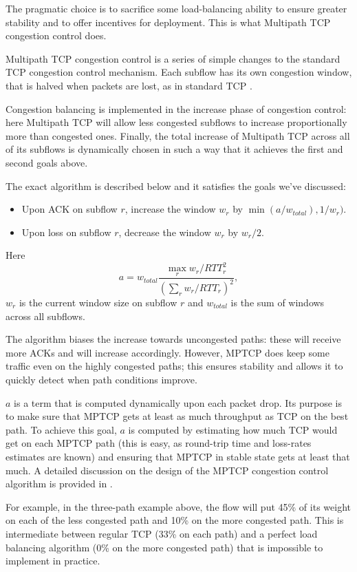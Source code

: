 The pragmatic choice is to sacrifice some load-balancing ability to ensure greater stability and
to offer incentives for deployment. This is what Multipath TCP congestion control does.

Multipath TCP congestion control is a series of simple changes to the standard TCP congestion control mechanism. Each subflow 
has its own congestion window, that is halved when packets are lost, as in standard TCP \cite{mptcp-cc}.

Congestion balancing is implemented in the increase phase of 
congestion control: here Multipath TCP will allow less congested subflows 
to increase proportionally more than congested ones. Finally, the total 
increase of Multipath TCP across all of its subflows is dynamically chosen 
in such a way that it achieves the first and second goals above. 

The exact algorithm is described below and it satisfies the goals we've discussed:
\begin{itemize}
\item Upon ACK on subflow $r$, increase the window $w_r$ by
$\min(a/w_{total}),1/w_r)$.
\item Upon loss on subflow $r$, decrease the window $w_r$ by $w_r/2$.
\end{itemize}
Here
\begin{equation}
\label{eq:a}
a = w_{total} \frac{\max_r w_r/RTT_r^2}{(\sum_r
  w_r/RTT_r)^2},
\end{equation}
$w_r$ is the current window size on subflow $r$ and $w_{total}$ is the
sum of windows across all subflows. 

The algorithm biases the increase towards uncongested paths: these will receive
more ACKs and will increase accordingly. However, MPTCP does keep some traffic
even on the highly congested paths; this ensures stability and allows it
to quickly detect when path conditions improve.

$a$ is a term that is computed dynamically upon each packet drop. Its purpose 
is to make sure that MPTCP gets at least as much throughput as TCP on the best path.
To achieve this goal, $a$ is computed by estimating how much TCP would get on each MPTCP path
(this is easy, as round-trip time and loss-rates estimates are known) and ensuring that MPTCP
in stable state gets at least that much. A detailed discussion on the design of the MPTCP congestion
control algorithm is provided in \cite{mptcp-cc}.

For example, in the three-path example above, the flow will put
45\% of its weight on each of the less congested path and 10\% on the
more congested path. This is intermediate between regular TCP
(33\% on each path) and a perfect load balancing algorithm (0\% on the more congested path)
that is impossible to implement in practice.


